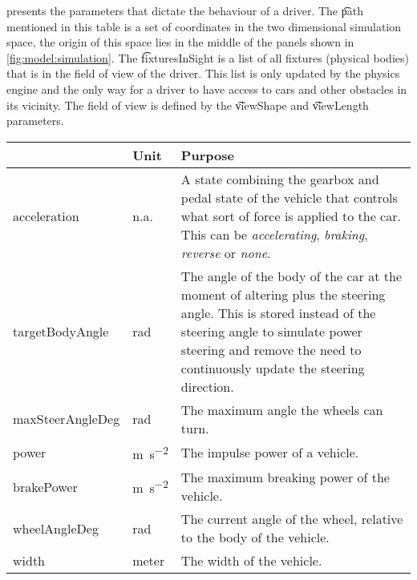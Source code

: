  presents the parameters that dictate the behaviour of a driver. The \t{path} mentioned in this table is a set of coordinates in the two dimensional simulation space, the origin of this space lies in the middle of the panels shown in \cref{fig:model:simulation}. The \t{fixturesInSight} is a list of all fixtures (physical bodies) that is in the field of view of the driver. This list is only updated by the physics engine and the only way for a driver to have access to cars and other obstacles in its vicinity. The field of view is defined by the \t{viewShape} and \t{viewLength} parameters.

\begin{table}
	\centering
	\begin{tabularx}{\textwidth}{>{\ttfamily}llX}
		\toprule
		\normalfont{Parameter}	&Unit & Purpose \\ 
		\midrule
		acceleration 			
			& n.a.
			& A state combining the gearbox and pedal state of the vehicle that controls what sort of force is applied to the car. This can be \emph{accelerating}, \emph{braking}, \emph{reverse} or \emph{none}.\\ 
		targetBodyAngle 		
			& \si{\radian}
			& The angle of the body of the car at the moment of altering plus the steering angle. This is stored instead of the steering angle to simulate power steering and remove the need to continuously update the steering direction. \\
		maxSteerAngleDeg 		
			& \si{\radian}
			& The maximum angle the wheels can turn. \\
		power 					
			& \si{\meter\per\square\second}
			& The impulse power of a vehicle. \\ 
		brakePower 		
			& \si{\meter\per\square\second} 
			& The maximum breaking power of the vehicle. \\				
		wheelAngleDeg 			
			& \si{\radian}
			& The current angle of the wheel, relative to the body of the vehicle. \\ 
		width 					
			& \si{meter} 
			& The width of the vehicle. \\ 

\end{tabularx}
\end{table}
